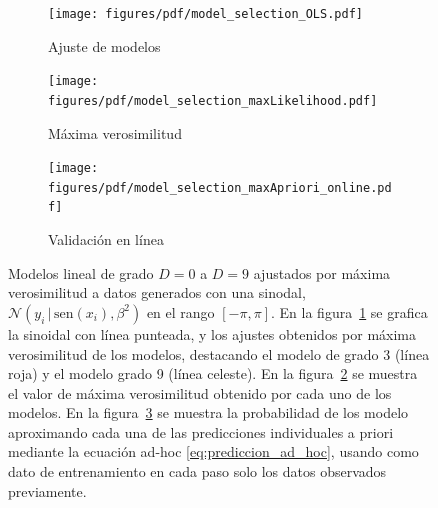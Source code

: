 \documentclass[a4paper,11pt]{book}
\newcommand{\N}{\mathcal{N}}
\theoremstyle{definition}
\begin{document}
\begin{figure}[ht!] \centering
  \begin{subfigure}[t]{0.32\textwidth}
  \centering
  \texttt{[image: figures/pdf/model\_selection\_OLS.pdf]}
  \caption{Ajuste de modelos}
  \label{fig:model_selection_OLS}
  \end{subfigure}
  \begin{subfigure}[t]{0.32\textwidth}
  \centering
  \texttt{[image: figures/pdf/model\_selection\_maxLikelihood.pdf]}
  \caption{Máxima verosimilitud}
  \label{fig:model_selection_maxLikelihood}
  \end{subfigure}
  \begin{subfigure}[t]{0.32\textwidth}
  \centering
  \texttt{[image: figures/pdf/model\_selection\_maxApriori\_online.pdf]}
  \caption{Validaci\'on en l\'inea}
  \label{fig:model_selection_maxApriori_online}
  \end{subfigure}
  \caption{Modelos lineal de grado $D=0$ a $D=9$ ajustados por m\'axima verosimilitud a datos generados con una sinodal, $\N(y_i \,| \, \text{sen}(x_i), \beta^2)$ en el rango $[-\pi,\pi]$.
  En la figura~\ref{fig:model_selection_OLS} se grafica la sinoidal con l\'inea punteada, y los ajustes obtenidos por máxima verosimilitud de los modelos, destacando el modelo de grado 3 (l\'inea roja) y el modelo grado 9 (l\'inea celeste).
  En la figura~\ref{fig:model_selection_maxLikelihood} se muestra el valor de máxima verosimilitud obtenido por cada uno de los modelos.
  En la figura~\ref{fig:model_selection_maxApriori_online} se muestra la probabilidad de los modelo aproximando cada una de las predicciones individuales a priori mediante la ecuación ad-hoc \eqref{eq:prediccion_ad_hoc}, usando como dato de entrenamiento en cada paso solo los datos observados previamente.
   }
  \label{fig:overfitting}
\end{figure}

\end{document}
